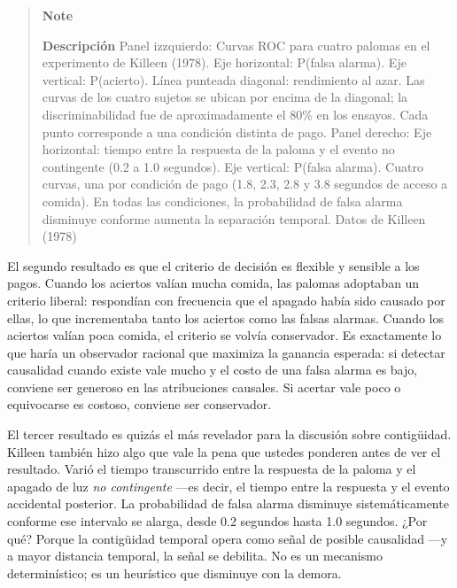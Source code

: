 \documentclass[
  letterpaper,
  DIV=11,
  numbers=noendperiod]{scrreprt}
\begin{document}
\begin{tcolorbox}[enhanced jigsaw, arc=.35mm, bottomrule=.15mm, breakable, colback=white, colframe=quarto-callout-note-color-frame, left=2mm, leftrule=.75mm, opacityback=0, rightrule=.15mm, toprule=.15mm]
\begin{figure}[H]
\end{figure}%

\begin{quote}
\textbf{Note}

\textbf{Descripción} Panel izzquierdo: Curvas ROC para cuatro palomas en
el experimento de Killeen (1978). Eje horizontal: P(falsa alarma). Eje
vertical: P(acierto). Línea punteada diagonal: rendimiento al azar. Las
curvas de los cuatro sujetos se ubican por encima de la diagonal; la
discriminabilidad fue de aproximadamente el 80\% en los ensayos. Cada
punto corresponde a una condición distinta de pago. Panel derecho: Eje
horizontal: tiempo entre la respuesta de la paloma y el evento no
contingente (0.2 a 1.0 segundos). Eje vertical: P(falsa alarma). Cuatro
curvas, una por condición de pago (1.8, 2.3, 2.8 y 3.8 segundos de
acceso a comida). En todas las condiciones, la probabilidad de falsa
alarma disminuye conforme aumenta la separación temporal. Datos de
Killeen (1978)
\end{quote}

El segundo resultado es que el criterio de decisión es flexible y
sensible a los pagos. Cuando los aciertos valían mucha comida, las
palomas adoptaban un criterio liberal: respondían con frecuencia que el
apagado había sido causado por ellas, lo que incrementaba tanto los
aciertos como las falsas alarmas. Cuando los aciertos valían poca
comida, el criterio se volvía conservador. Es exactamente lo que haría
un observador racional que maximiza la ganancia esperada: si detectar
causalidad cuando existe vale mucho y el costo de una falsa alarma es
bajo, conviene ser generoso en las atribuciones causales. Si acertar
vale poco o equivocarse es costoso, conviene ser conservador.

El tercer resultado es quizás el más revelador para la discusión sobre
contigüidad. Killeen también hizo algo que vale la pena que ustedes
ponderen antes de ver el resultado. Varió el tiempo transcurrido entre
la respuesta de la paloma y el apagado de luz \emph{no contingente}
---es decir, el tiempo entre la respuesta y el evento accidental
posterior. La probabilidad de falsa alarma disminuye sistemáticamente
conforme ese intervalo se alarga, desde 0.2 segundos hasta 1.0 segundos.
¿Por qué? Porque la contigüidad temporal opera como señal de posible
causalidad ---y a mayor distancia temporal, la señal se debilita. No es
un mecanismo determinístico; es un heurístico que disminuye con la
demora.


\end{tcolorbox}
\end{document}
